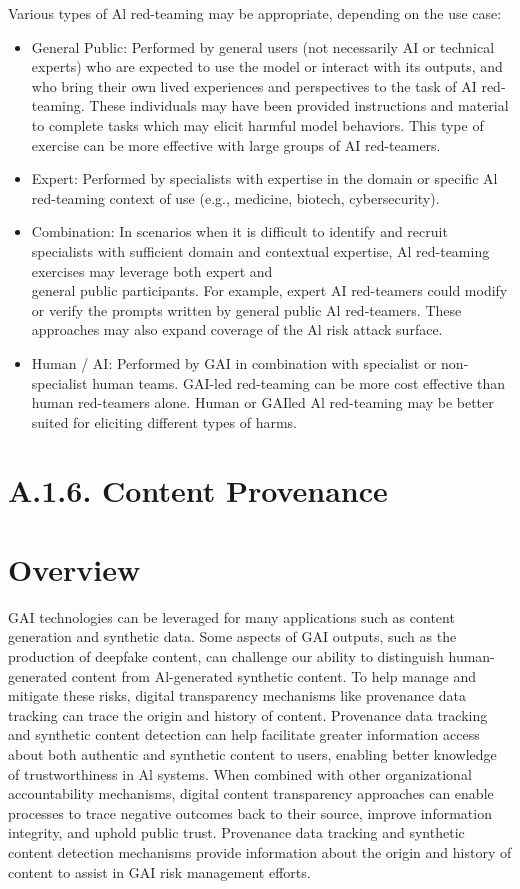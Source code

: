 \documentclass[10pt]{article}
\begin{document}
Various types of Al red-teaming may be appropriate, depending on the use case:
\begin{itemize}
  \item General Public: Performed by general users (not necessarily AI or technical experts) who are expected to use the model or interact with its outputs, and who bring their own lived experiences and perspectives to the task of AI red-teaming. These individuals may have been provided instructions and material to complete tasks which may elicit harmful model behaviors. This type of exercise can be more effective with large groups of AI red-teamers.
  \item Expert: Performed by specialists with expertise in the domain or specific Al red-teaming context of use (e.g., medicine, biotech, cybersecurity).
  \item Combination: In scenarios when it is difficult to identify and recruit specialists with sufficient domain and contextual expertise, Al red-teaming exercises may leverage both expert and\\
general public participants. For example, expert AI red-teamers could modify or verify the prompts written by general public Al red-teamers. These approaches may also expand coverage of the Al risk attack surface.
  \item Human / AI: Performed by GAI in combination with specialist or non-specialist human teams. GAI-led red-teaming can be more cost effective than human red-teamers alone. Human or GAIled Al red-teaming may be better suited for eliciting different types of harms.
\end{itemize}
\section*{A.1.6. Content Provenance}
\section*{Overview}
GAI technologies can be leveraged for many applications such as content generation and synthetic data. Some aspects of GAI outputs, such as the production of deepfake content, can challenge our ability to distinguish human-generated content from Al-generated synthetic content. To help manage and mitigate these risks, digital transparency mechanisms like provenance data tracking can trace the origin and history of content. Provenance data tracking and synthetic content detection can help facilitate greater information access about both authentic and synthetic content to users, enabling better knowledge of trustworthiness in Al systems. When combined with other organizational accountability mechanisms, digital content transparency approaches can enable processes to trace negative outcomes back to their source, improve information integrity, and uphold public trust. Provenance data tracking and synthetic content detection mechanisms provide information about the origin and history of content to assist in GAI risk management efforts.
\end{document}

